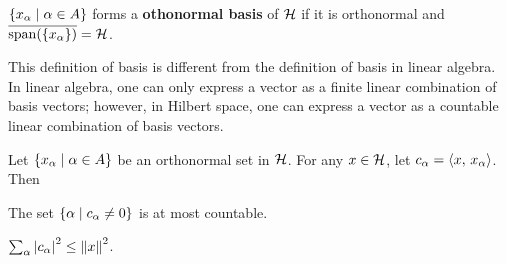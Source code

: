\begin{definition}
    $\left\{ x_\alpha \;\middle\vert\; \alpha\in A \right\}$ forms a \textbf{othonormal basis} 
    of $\mathcal{H}$ if it is orthonormal and $\overline{\operatorname{span}(\left\{ {x_\alpha} \right\})} = \mathcal{H}$. 
\end{definition}
\begin{remark}
    This definition of basis is different from the definition 
    of basis in linear algebra. In linear algebra, one can only 
    express a vector as a finite linear combination of basis vectors; 
    however, in Hilbert space, one can express a vector as a countable 
    linear combination of basis vectors.
\end{remark}

\begin{lemma}\label{lem:bessel}
    Let $\left\{ x_\alpha \;\middle\vert\; \alpha\in A \right\}$ be an orthonormal set in $\mathcal{H}$. 
    For any $x\in\mathcal{H}$, let $c_\alpha = \left\langle {x},\, {x_\alpha} \right\rangle$. Then 
    \begin{thmenum}
        \item The set $\left\{ \alpha \;\middle\vert\; c_\alpha\neq 0 \right\}$ is at most countable. 
        \item $\sum_\alpha \left\lvert {c_\alpha} \right\rvert^2 \leq \left\lVert {x} \right\rVert^2$.
    \end{thmenum}
\end{lemma}
